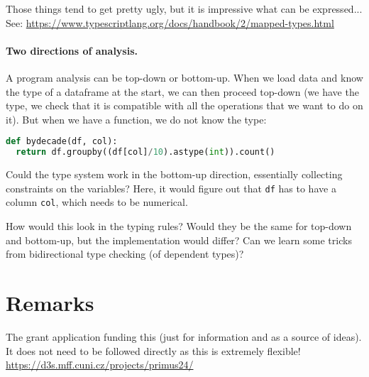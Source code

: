 \documentclass{article}
\begin{document}
Those things tend to get pretty ugly, but it is impressive what can be expressed...
See: \url{https://www.typescriptlang.org/docs/handbook/2/mapped-types.html}

\paragraph{Two directions of analysis.}
A program analysis can be top-down or bottom-up. When we load data and know the type of a dataframe at the start, we can then proceed top-down (we have the type, we check that it is compatible with all the operations that we want to do on it). But when we have a function, we do not know the type:

\begin{lstlisting}[language=Python]
def bydecade(df, col):
  return df.groupby((df[col]/10).astype(int)).count()
\end{lstlisting}

Could the type system work in the bottom-up direction, essentially collecting constraints on the variables? Here, it would figure out that \texttt{df} has to have a column \texttt{col}, which needs to be numerical.

How would this look in the typing rules? Would they be the same for top-down and bottom-up, but the implementation would differ? Can we learn some tricks from bidirectional type checking (of dependent types)?

\section{Remarks}
The grant application funding this (just for information and as a source of ideas). It does not need to be followed directly as this is extremely flexible! \url{https://d3s.mff.cuni.cz/projects/primus24/}
\end{document}
